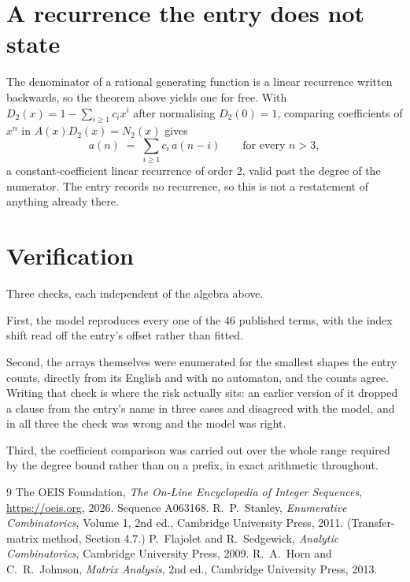 \documentclass[11pt,a4paper]{article}
\theoremstyle{plain}
\theoremstyle{definition}
\begin{document}
\section{A recurrence the entry does not state}

The denominator of a rational generating function is a linear recurrence written backwards, so
the theorem above yields one for free. With $D_2(x)=1-\sum_{i\ge1}c_ix^i$ after normalising
$D_2(0)=1$, comparing coefficients of $x^n$ in $A(x)D_2(x)=N_2(x)$ gives
\[
a(n)\;=\;\sum_{i\ge1}c_i\,a(n-i)\qquad\text{for every }n>3,
\]
a constant-coefficient linear recurrence of order $2$, valid past the degree of the
numerator. The entry records no recurrence, so this is not a restatement of anything
already there.

\section{Verification}

Three checks, each independent of the algebra above.

First, the model reproduces every one of the $46$ published terms, with the index shift
read off the entry's offset rather than fitted.

Second, the arrays themselves were enumerated for the smallest shapes the entry counts,
directly from its English and with no automaton, and the counts agree. Writing that check is
where the risk actually sits: an earlier version of it dropped a clause from the entry's name
in three cases and disagreed with the model, and in all three the check was wrong and the model
was right.

Third, the coefficient comparison was carried out over the whole range required by the degree
bound rather than on a prefix, in exact arithmetic throughout.

\begin{thebibliography}{9}
 The OEIS Foundation, \emph{The On-Line Encyclopedia of Integer
Sequences}, \url{https://oeis.org}, 2026. Sequence A063168.
 R.~P.~Stanley, \emph{Enumerative Combinatorics}, Volume 1, 2nd ed.,
Cambridge University Press, 2011. (Transfer-matrix method, Section 4.7.)
 P.~Flajolet and R.~Sedgewick, \emph{Analytic Combinatorics}, Cambridge
University Press, 2009.
 R.~A.~Horn and C.~R.~Johnson, \emph{Matrix Analysis}, 2nd ed., Cambridge
University Press, 2013.
\end{thebibliography}
\end{document}
